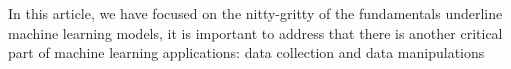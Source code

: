 In this article, we have focused on the nitty-gritty of the fundamentals underline machine learning models, it is important to address that there is another critical part of machine learning applications: data collection and data manipulations 